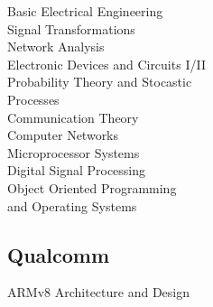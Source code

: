 \documentclass[letterpaper]{deedy-resume} %
\begin{document}
\begin{minipage}[t]{0.33\textwidth}
\textbullet{} Basic Electrical Engineering \\
\textbullet{} Signal Transformations \\
\textbullet{} Network Analysis \\
\textbullet{} Electronic Devices and Circuits I/II \\
\textbullet{} Probability Theory and Stocastic \\ \hphantom{\textbullet{}} Processes \\
\textbullet{} Communication Theory \\
\textbullet{} Computer Networks \\
\textbullet{} Microprocessor Systems \\
\textbullet{} Digital Signal Processing \\
\textbullet{} Object Oriented Programming \\ \hphantom{\textbullet{}} and Operating Systems \\

\subsection{Qualcomm}
\textbullet{} ARMv8 Architecture and Design \\
\sectionspace %



\end{minipage} %
\hfill
%
%
\end{document}
